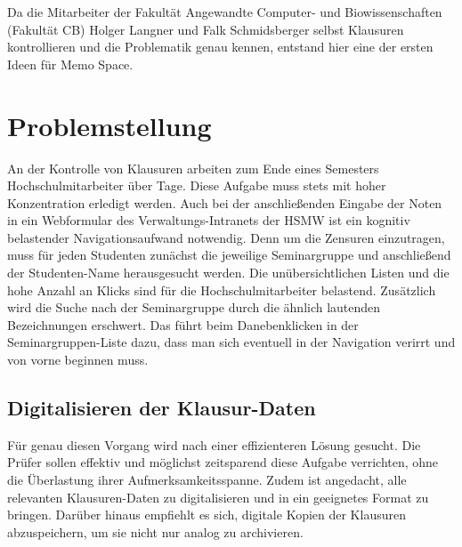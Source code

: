 \documentclass[notables, nomenclature, oneside, 150]{HSMW-Thesis}
\begin{document}
	Da die Mitarbeiter der Fakultät Angewandte Computer- und Biowissenschaften (Fakultät CB) Holger Langner und Falk Schmidsberger selbst Klausuren kontrollieren und die Problematik genau kennen, entstand hier eine der ersten Ideen für Memo Space.


\chapter{Problemstellung}\label{ch:problemstellung}
	An der Kontrolle von Klausuren arbeiten zum Ende eines Semesters Hochschulmitarbeiter über Tage. Diese Aufgabe muss stets mit hoher Konzentration erledigt werden. Auch bei der anschließenden Eingabe der Noten in ein Webformular des Verwaltungs-Intranets der HSMW ist ein kognitiv belastender Navigationsaufwand notwendig. Denn um die Zensuren einzutragen, muss für jeden Studenten zunächst die jeweilige Seminargruppe und anschließend der Studenten-Name herausgesucht werden. Die unübersichtlichen Listen und die hohe Anzahl an Klicks sind für die Hochschulmitarbeiter belastend. Zusätzlich wird die Suche nach der Seminargruppe durch die ähnlich lautenden Bezeichnungen erschwert. Das führt beim Danebenklicken in der Seminargruppen-Liste dazu, dass man sich eventuell in der Navigation verirrt und von vorne beginnen muss.
	
	\section{Digitalisieren der Klausur-Daten}
	Für genau diesen Vorgang wird nach einer effizienteren Lösung gesucht. Die Prüfer sollen effektiv und möglichst zeitsparend diese Aufgabe verrichten, ohne die Überlastung ihrer Aufmerksamkeitsspanne. Zudem ist angedacht, alle relevanten Klausuren-Daten zu digitalisieren und in ein geeignetes Format zu bringen. Darüber hinaus empfiehlt es sich, digitale Kopien der Klausuren abzuspeichern, um sie nicht nur analog zu archivieren.
	
\end{document}
